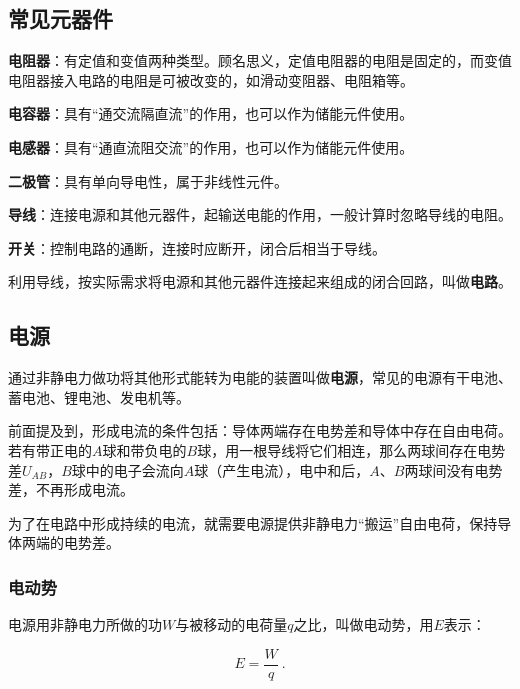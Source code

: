 
\begin{issues}
\issueDraft
\issueTODO
\end{issues}


\subsection{常见元器件}

\textbf{电阻器}：有定值和变值两种类型。顾名思义，定值电阻器的电阻是固定的，而变值电阻器接入电路的电阻是可被改变的，如滑动变阻器、电阻箱等。

\textbf{电容器}：具有“通交流隔直流”的作用，也可以作为储能元件使用。

\textbf{电感器}：具有“通直流阻交流”的作用，也可以作为储能元件使用。

\textbf{二极管}：具有单向导电性，属于非线性元件。

\textbf{导线}：连接电源和其他元器件，起输送电能的作用，一般计算时忽略导线的电阻。

\textbf{开关}：控制电路的通断，连接时应断开，闭合后相当于导线。

利用导线，按实际需求将电源和其他元器件连接起来组成的闭合回路，叫做\textbf{电路}。

\subsection{电源}

通过非静电力做功将其他形式能转为电能的装置叫做\textbf{电源}，常见的电源有干电池、蓄电池、锂电池、发电机等。

前面提及到，形成电流的条件包括：导体两端存在电势差和导体中存在自由电荷。若有带正电的$A$球和带负电的$B$球，用一根导线将它们相连，那么两球间存在电势差$U_{AB}$，$B$球中的电子会流向$A$球（产生电流），电中和后，$A$、$B$两球间没有电势差，不再形成电流。

为了在电路中形成持续的电流，就需要电源提供非静电力“搬运”自由电荷，保持导体两端的电势差。

\subsubsection{电动势}

电源用非静电力所做的功$W$与被移动的电荷量$q$之比，叫做电动势，用$E$表示：

\begin{equation}
E=\frac{W}{q}~.
\end{equation}

